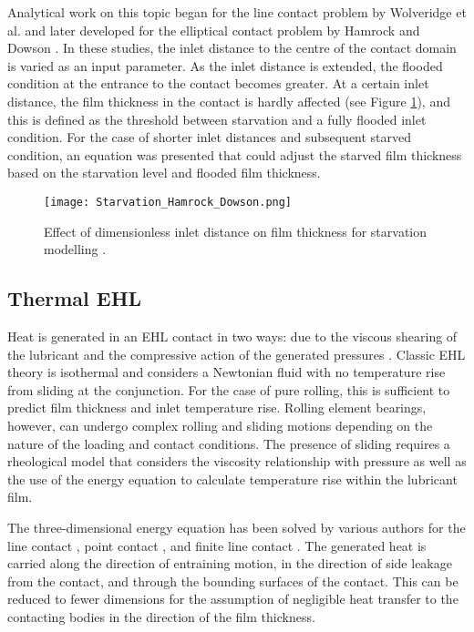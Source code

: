 Analytical work on this topic began for the line contact problem by Wolveridge et al. \cite{Wolveridge1970a} and later developed for the elliptical contact problem by Hamrock and Dowson \cite{Hamrock1976}. In these studies, the inlet distance to the centre of the contact domain is varied as an input parameter. As the inlet distance is extended, the flooded condition at the entrance to the contact becomes greater. At a certain inlet distance, the film thickness in the contact is hardly affected (see Figure \ref{Starvation_Hamrock_Dowson}), and this is defined as the threshold between starvation and a fully flooded inlet condition. For the case of shorter inlet distances and subsequent starved condition, an equation was presented that could adjust the starved film thickness based on the starvation level and flooded film thickness.

\begin{figure}
	\centerline{\texttt{[image: Starvation\_Hamrock\_Dowson.png]}}
	\caption{Effect of dimensionless inlet distance on film thickness for starvation modelling \cite{Hamrock1976}.}
	\label{Starvation_Hamrock_Dowson}
\end{figure}

\subsection{Thermal EHL}

Heat is generated in an EHL contact in two ways: due to the viscous shearing of the lubricant and the compressive action of the generated pressures \cite{Mohammadpour2015c}. Classic EHL theory is isothermal and considers a Newtonian fluid with no temperature rise from sliding at the conjunction. For the case of pure rolling, this is sufficient to predict film thickness and inlet temperature rise. Rolling element bearings, however, can undergo complex rolling and sliding motions depending on the nature of the loading and contact conditions. The presence of sliding requires a rheological model that considers the viscosity relationship with pressure as well as the use of the energy equation to calculate temperature rise within the lubricant film.

The three-dimensional energy equation has been solved by various authors for the line contact \cite{Yang2001}, point contact \cite{Kim1993},\cite{Kim1993a} and finite line contact \cite{Liu2002}. The generated heat is carried along the direction of entraining motion, in the direction of side leakage from the contact, and through the bounding surfaces of the contact. This can be reduced to fewer dimensions for the assumption of negligible heat transfer to the contacting bodies in the direction of the film thickness.

